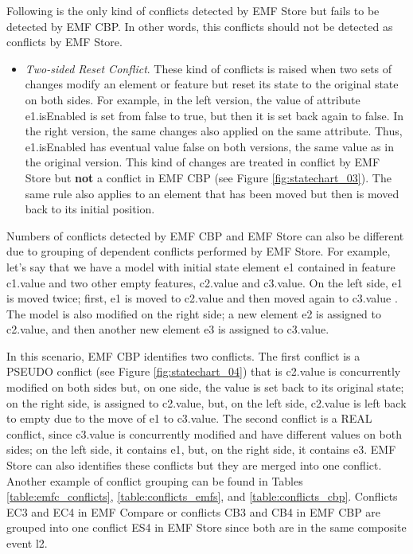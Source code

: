 Following is the only kind of conflicts detected by EMF Store but fails to be detected by EMF CBP. In other words, this conflicts should not be detected as conflicts by EMF Store.
\begin{itemize}
  \item \emph{Two-sided Reset Conflict}. These kind of conflicts is raised when two sets of changes modify an element or feature but reset its state to the original state on both sides. For example, in the left version, the value of attribute \textsf{e1}.\textsf{isEnabled} is set from \textsf{false} to \textsf{true}, but then it is set back again to \textsf{false}. In the right version, the same changes also applied on the same attribute. Thus, \textsf{e1}.\textsf{isEnabled} has eventual value \textsf{false} on both versions, the same value as in the original version. This kind of changes are treated in conflict by EMF Store but \textbf{not} a conflict in EMF CBP (see Figure \ref{fig:statechart_03}). The same rule also applies to an element that has been moved but then is moved back to its initial position.
\end{itemize}

Numbers of conflicts detected by EMF CBP and EMF Store can also be different due to grouping of dependent conflicts performed by EMF Store. For example, let's say that we have a model with initial state element \textsf{e1} contained in feature \textsf{c1}.\textsf{value} and two other empty features, \textsf{c2}.\textsf{value} and \textsf{c3}.\textsf{value}. On the left side, \textsf{e1} is moved twice; first, \textsf{e1} is moved to \textsf{c2}.\textsf{value} and then moved again to \textsf{c3}.\textsf{value} . The model is also modified on the right side; a new element \textsf{e2} is assigned to \textsf{c2}.\textsf{value}, and then another new element \textsf{e3} is assigned to \textsf{c3}.\textsf{value}. 

In this scenario, EMF CBP identifies two conflicts. The first conflict is a \textsf{PSEUDO} conflict (see Figure \ref{fig:statechart_04}) that is \textsf{c2}.\textsf{value} is concurrently modified on both sides but, on one side, the value is set back to its original state; on the right side,  is assigned to \textsf{c2}.\textsf{value}, but, on the left side, \textsf{c2}.\textsf{value} is left back to empty due to the move of \textsf{e1} to \textsf{c3}.\textsf{value}. The second conflict is a \textsf{REAL} conflict, since \textsf{c3}.\textsf{value} is concurrently modified and have different values on both sides; on the left side, it contains \textsf{e1}, but, on the right side, it contains \textsf{e3}. EMF Store can also identifies these conflicts but they are merged into one conflict. Another example of conflict grouping can be found in Tables \ref{table:emfc_conflicts}, \ref{table:conflicts_emfs}, and \ref{table:conflicts_cbp}. Conflicts \textsf{EC3} and \textsf{EC4} in EMF Compare or conflicts \textsf{CB3} and \textsf{CB4} in EMF CBP are grouped into one conflict \textsf{ES4} in EMF Store since both are in the same composite event \textsf{l2}.

